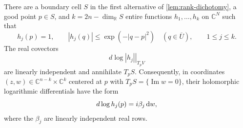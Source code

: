 \begin{proposition}
\label{prop:supported-point}
There are a boundary cell $S$ in the first alternative of \cref{lem:rank-dichotomy}, a good point $p\in S$, and $k=2n-\dim_{\mathbb{R}}S$ entire functions $h_1,\ldots,h_k$ on $\mathbb{C}^N$ such that
\begin{equation}
 h_j(p)=1,\qquad
 |h_j(q)|\leq\exp(-|q-p|^2)\quad(q\in\overline U),
 \qquad 1\leq j\leq k.
 \label{eq:peak}
\end{equation}
The real covectors
\[
 \left.d\log|h_j|\right|_{T_pV}
\]
are linearly independent and annihilate $T_pS$.  Consequently, in coordinates $(z,w)\in\mathbb{C}^{n-k}\times\mathbb{C}^k$ centered at $p$ with $T_pS=\{\operatorname{Im}w=0\}$, their holomorphic logarithmic differentials have the form
\[
 d\log h_j(p)=i\beta_j\,\mathrm{d} w,
\]
where the $\beta_j$ are linearly independent real rows.
\end{proposition}

